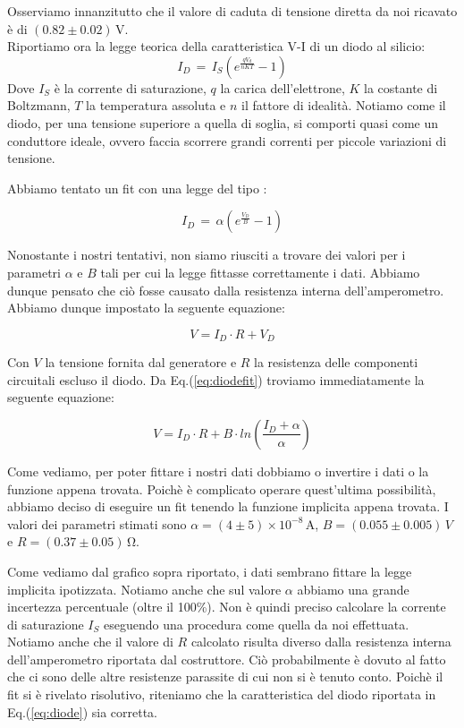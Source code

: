 \phantom{x}

Osserviamo innanzitutto che il valore di caduta di tensione diretta da noi ricavato è di $(0.82 \pm 0.02)\,\si{\volt}$.\\
Riportiamo ora la legge teorica della caratteristica V-I di un diodo al silicio:
\begin{equation}
I_{D} \, = \, I_{S} \left( e^{\frac{q V_d}{nKT}} -1 \right)
\label{eq:diode}
\end{equation}
Dove $I_S$ è la corrente di saturazione, $q$ la carica dell'elettrone, $K$ la costante di Boltzmann, $T$ la temperatura assoluta e $n$ il fattore di idealità. 
Notiamo come il diodo, per una tensione superiore a quella di soglia, si comporti quasi come un conduttore ideale, ovvero faccia scorrere grandi correnti per piccole variazioni di tensione. 

Abbiamo tentato un fit con una legge del tipo : 

\begin{equation}
I_{D} \, = \, \alpha \left( e^{\frac{V_{D}}{B}} -1 \right)
\label{eq:diodefit}
\end{equation}

Nonostante i nostri tentativi, non siamo riusciti a trovare dei valori per i parametri $\alpha$ e $B$ tali per cui la legge fittasse correttamente i dati. Abbiamo dunque pensato che ciò fosse causato dalla resistenza interna dell'amperometro. Abbiamo dunque impostato la seguente equazione:

$$V=I_D \cdot R + V_D$$

Con $V$ la tensione fornita dal generatore e $R$ la resistenza delle componenti circuitali escluso il diodo. Da Eq.(\ref{eq:diodefit}) troviamo immediatamente la seguente equazione:

\begin{equation}
V=I_D \cdot R + B \cdot ln (\frac{I_D+\alpha}{\alpha})
\label{eq:diodefit2}
\end{equation}

Come vediamo, per poter fittare i nostri dati dobbiamo o invertire i dati o la funzione appena trovata. Poichè è complicato operare quest'ultima possibilità, abbiamo deciso di eseguire un fit tenendo la funzione implicita appena trovata. I valori dei parametri stimati sono $\alpha=(4\pm 5)\times 10^{-8} \,\si{\ampere}$, $B=(0.055\pm 0.005)\,V $ e $R=(0.37\pm 0.05)\,\si{\ohm}$.

Come vediamo dal grafico sopra riportato, i dati sembrano fittare la legge implicita ipotizzata. Notiamo anche che sul valore $\alpha$ abbiamo una grande incertezza percentuale (oltre il 100\%). Non è quindi preciso calcolare la corrente di saturazione $I_S$ eseguendo una procedura come quella da noi effettuata. Notiamo anche che il valore di $R$ calcolato risulta diverso dalla resistenza interna dell'amperometro riportata dal costruttore. Ciò probabilmente è dovuto al fatto che ci sono delle altre resistenze parassite di cui non si è tenuto conto. Poichè il fit si è rivelato risolutivo, riteniamo che la caratteristica del diodo riportata in Eq.(\ref{eq:diode}) sia corretta.
 
